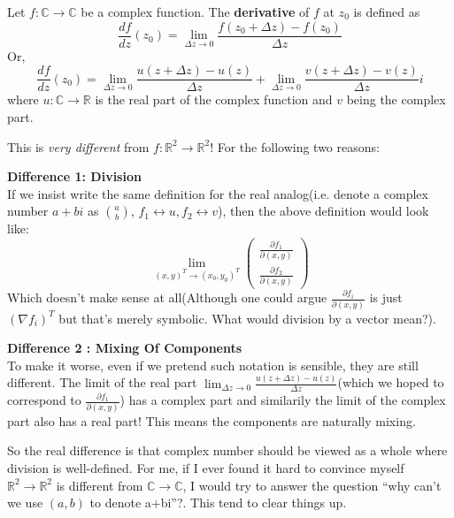 \begin{definition}Let $f:\mathbb{C} \to \mathbb{C}$ be a complex function. The \textbf{derivative} of $f$ at $z_0$ is defined as
\begin{equation}
\frac{df}{dz}({z_0})= \lim_{\Delta z\to 0}\frac{f(z_0 + \Delta z) -f(z_0)}{\Delta z}
\end{equation}
Or,
\begin{equation}
\frac{df}{dz}({z_0})= \lim_{\Delta z\to 0}\frac{u(z+\Delta z) -u(z)}{\Delta z} + \lim_{\Delta z\to 0}\frac{v(z+\Delta z) -v(z)}{\Delta z} i
\end{equation}
where $u : \mathbb{C} \to \mathbb{R}$ is the real part of the complex function and $v$ being the complex part.

\end{definition}This is \textit{very different} from $f:\mathbb{R}^2 \to \mathbb{R}^2$! For the following two reasons:

\begin{framed}
\textbf{Difference 1: Division}\\
If we insist write the same definition for the real analog(i.e. denote a complex number $a+bi$ as $a \choose b$, $f_1\leftrightarrow u, f_2\leftrightarrow v$), then the above definition would look like:
\begin{equation}
\lim_{(x,y)^T \to (x_0,y_0)^T}
\begin{pmatrix}
\frac{\partial f_1}{\partial (x, y)} \\
\frac{\partial f_2}{\partial (x, y)}
\end{pmatrix}
\end{equation}
Which doesn't make sense at all(Although one could argue $\frac{\partial f_i}{\partial (x,y)}$ is just $(\nabla f_i)^T$ but that's merely symbolic. What would division by a vector mean?).
\end{framed}

\begin{framed}
\textbf{Difference 2 : Mixing Of Components}\\
To make it worse, even if we pretend such notation is sensible, they are still different. The limit of the real part $\lim_{\Delta z\to 0}\frac{u(z+\Delta z) -u(z)}{\Delta z}$(which we hoped to correspond to $\frac{\partial f_1}{\partial (x,y)}$) has a complex part and similarily the limit of the complex part also has a real part! This means the components are naturally mixing.
\end{framed}

So the real difference is that complex number should be viewed as a whole where division is well-defined. For me, if I ever found it hard to convince myself $\mathbb{R}^2 \to \mathbb{R}^2$ is different from $\mathbb{C} \to \mathbb{C}$, I would try to answer the question ``why can't we use $(a,b)$ to denote a+bi''?. This tend to clear things up.

